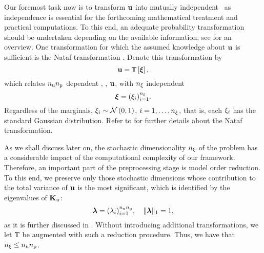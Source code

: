 Our foremost task now is to transform $\mathbf{u}$ into mutually independent \rvs\ as independence is essential for the forthcoming mathematical treatment and practical computations.
To this end, an adequate probability transformation should be undertaken depending on the available information; see \cite{eldred2008} for an overview.
One transformation for which the assumed knowledge about $\mathbf{u}$ is sufficient is the Nataf transformation \cite{li2008}.
Denote this transformation by
\begin{equation} \elab{probability-transformation}
  \vu = \transformation{\vz},
\end{equation}
which relates ${n_\text{u}} {n_\text{p}}$ dependent \rvs, \ie, $\mathbf{u}$, with ${n_\xi}$ independent \rvs
\begin{equation} \elab{independent-random-variables}
  \vz = (\z_i)_{i = 1}^\nvars.
\end{equation}
Regardless of the marginals, $\xi_i \sim \mathcal{N}\left( 0, 1 \right)$, $i = 1, \dots, {n_\xi}$, that is, each $\xi_i$ has the standard Gaussian distribution.
Refer to  for further details about the Nataf transformation.

As we shall discuss later on, the stochastic dimensionality ${n_\xi}$ of the problem has a considerable impact of the computational complexity of our framework.
Therefore, an important part of the preprocessing stage is model order reduction.
To this end, we preserve only those stochastic dimensions whose contribution to the total variance of $\mathbf{u}$ is the most significant, which is identified by the eigenvalues of $\mathbf{K}_u$:
\begin{equation} \elab{dimension-contribution}
  \dimensionContribution = (\lambda_i)_{i = 1}^{\nparams \nprocs}, \hspace{1em} \norm[1]{\dimensionContribution} = 1,
\end{equation}
as it is further discussed in .
Without introducing additional transformations, we let $\transformation$ be augmented with such a reduction procedure.
Thus, we have that ${n_\xi} \leq {n_\text{u}} {n_\text{p}}$.

